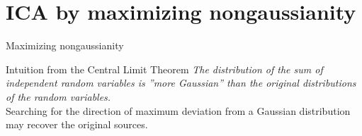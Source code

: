 \section{ICA by maximizing nongaussianity}


\begin{frame}{Maximizing nongaussianity}

\begin{block}{Intuition from the Central Limit Theorem}
\emph{The distribution of the sum of independent random variables is ''more Gaussian'' than the original distributions of the random variables.}\\\vspace{2mm}
Searching for the direction of maximum deviation from a Gaussian distribution may recover the original sources.
\end{block}
\end{frame}




